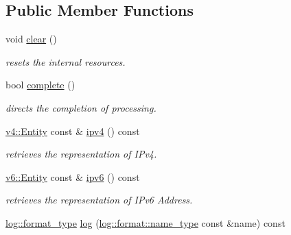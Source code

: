 \subsection*{Public Member Functions}
\begin{DoxyCompactItemize}
\item 
\hypertarget{classhryky_1_1ip_1_1vf_1_1_reader_a059be0871ad10978729566ad7eddbb43}{void \hyperlink{classhryky_1_1ip_1_1vf_1_1_reader_a059be0871ad10978729566ad7eddbb43}{clear} ()}\label{classhryky_1_1ip_1_1vf_1_1_reader_a059be0871ad10978729566ad7eddbb43}

\begin{DoxyCompactList}\small\item\em resets the internal resources. \end{DoxyCompactList}\item 
\hypertarget{classhryky_1_1ip_1_1vf_1_1_reader_a59a5c5906aba0306b5ecce2af1c5a29c}{bool \hyperlink{classhryky_1_1ip_1_1vf_1_1_reader_a59a5c5906aba0306b5ecce2af1c5a29c}{complete} ()}\label{classhryky_1_1ip_1_1vf_1_1_reader_a59a5c5906aba0306b5ecce2af1c5a29c}

\begin{DoxyCompactList}\small\item\em directs the completion of processing. \end{DoxyCompactList}\item 
\hypertarget{classhryky_1_1ip_1_1vf_1_1_reader_a9ab8c098a7c01ac5467730a819a04ee1}{\hyperlink{classhryky_1_1ip_1_1v4_1_1_entity}{v4\-::\-Entity} const \& \hyperlink{classhryky_1_1ip_1_1vf_1_1_reader_a9ab8c098a7c01ac5467730a819a04ee1}{ipv4} () const }\label{classhryky_1_1ip_1_1vf_1_1_reader_a9ab8c098a7c01ac5467730a819a04ee1}

\begin{DoxyCompactList}\small\item\em retrieves the representation of I\-Pv4. \end{DoxyCompactList}\item 
\hypertarget{classhryky_1_1ip_1_1vf_1_1_reader_a3380d0502e52243ccc333b24f028f7ba}{\hyperlink{classhryky_1_1ip_1_1v6_1_1_entity}{v6\-::\-Entity} const \& \hyperlink{classhryky_1_1ip_1_1vf_1_1_reader_a3380d0502e52243ccc333b24f028f7ba}{ipv6} () const }\label{classhryky_1_1ip_1_1vf_1_1_reader_a3380d0502e52243ccc333b24f028f7ba}

\begin{DoxyCompactList}\small\item\em retrieves the representation of I\-Pv6 Address. \end{DoxyCompactList}\item 
\hypertarget{classhryky_1_1ip_1_1vf_1_1_reader_aed01f2ee6c18a65cbd8157dc55e886e0}{\hyperlink{namespacehryky_1_1log_ad50448c3f934f1eacd5c1bcffe8111e1}{log\-::format\-\_\-type} \hyperlink{classhryky_1_1ip_1_1vf_1_1_reader_aed01f2ee6c18a65cbd8157dc55e886e0}{log} (\hyperlink{namespacehryky_1_1log_1_1format_ab7408d1e2ed2d648dbf9bba69eb74288}{log\-::format\-::name\-\_\-type} const \&name) const }\label{classhryky_1_1ip_1_1vf_1_1_reader_aed01f2ee6c18a65cbd8157dc55e886e0}


\end{DoxyCompactItemize}
